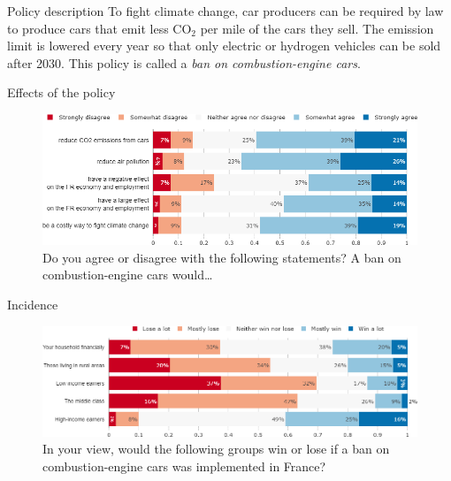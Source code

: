 \begin{framefont}{\small}
\begin{frame}{Policy description}%
To fight climate change, car producers can be required by law to produce cars that emit less CO$_\text{2}$ per mile of the cars they sell. The emission limit is lowered every year so that only electric or hydrogen vehicles can be sold after 2030. This policy is called a \textit{ban on combustion-engine cars}. 
\end{frame}


\begin{frame}{Effects of the policy}%

\begin{figure}[h!]
\centering
\caption{Do you agree or disagree with the following statements? A ban on combustion-engine cars would…}
\includegraphics[width=.87\paperwidth]{../figures/FR/standard_effect_FR.png}
\end{figure}
\end{frame}

\begin{frame}{Incidence}%
\begin{figure}[h!]
\centering %
\caption{In your view, would the following groups win or lose if a ban on combustion-engine cars was implemented in France?}
\includegraphics[width=.87\paperwidth]{../figures/FR/standard_win_lose_FR.png}
\end{figure}
\end{frame}


\end{framefont}
